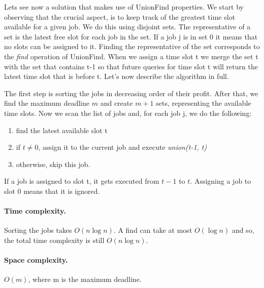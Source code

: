 \documentclass{article}
\begin{document}
\medskip

Lets see now a solution that makes use of UnionFind properties. We start by observing that the crucial aspect,
is to keep track of the greatest time slot available for a given job. We do this using disjoint sets. The  representative of a set
is the latest free slot for each job in the set. If a job j is in set 0 it means that no slots can be assigned to it. Finding the representative
of the set corresponds to the \emph{find} operation of UnionFind. When we assign a time slot t
we merge the set t with the set that contains t-1 so that future queries for time slot t will return the latest time slot that is before t. Let's now describe the algorithm in full.

\medskip

The first step is sorting the jobs in decreasing order of their profit. After that, we find the maximum deadline $m$ and create $m+1$ sets, representing the available time slots.
 Now we scan the list  of jobs and, for each job j,
we do the following:\begin{enumerate}
    \item find the latest available slot t
    \item if $t \neq 0$, assign it to the current job and
    execute \emph{union(t-1, t)}
    \item otherwise, skip this job.
\end{enumerate}
If a job is assigned to slot t, it gets executed from $t-1$ to $t$. Assigning a job to slot 0 means that it is ignored.
\paragraph{Time complexity.} Sorting the jobs takes $O(n \log n)$.
A find can take at most $O(\log n)$ and so, the total time complexity is still $O(n\log n)$.
\paragraph{Space complexity.} $O(m)$, where m is the maximum deadline.



\end{document}
